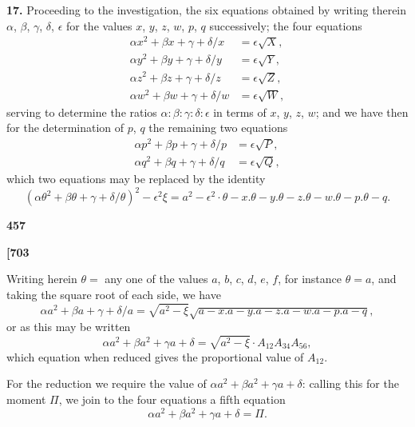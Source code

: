 \documentclass[12pt,a4paper]{article}
\theoremstyle{definition}
\begin{document}
\noindent\textbf{17.}\quad
Proceeding to the investigation, the six equations obtained by writing therein $\alpha$, $\beta$, $\gamma$, $\delta$, $\epsilon$ for the values $x$, $y$, $z$, $w$, $p$, $q$ successively; the four equations
\begin{align*}
\alpha x^2 + \beta x + \gamma + \delta/x &= \epsilon\sqrt{X}, \\
\alpha y^2 + \beta y + \gamma + \delta/y &= \epsilon\sqrt{Y}, \\
\alpha z^2 + \beta z + \gamma + \delta/z &= \epsilon\sqrt{Z}, \\
\alpha w^2 + \beta w + \gamma + \delta/w &= \epsilon\sqrt{W},
\end{align*}
serving to determine the ratios $\alpha : \beta : \gamma : \delta : \epsilon$ in terms of $x$, $y$, $z$, $w$; and we have then for the determination of $p$, $q$ the remaining two equations
\begin{align*}
\alpha p^2 + \beta p + \gamma + \delta/p &= \epsilon\sqrt{P}, \\
\alpha q^2 + \beta q + \gamma + \delta/q &= \epsilon\sqrt{Q},
\end{align*}
which two equations may be replaced by the identity
\[
(\alpha\theta^2 + \beta\theta + \gamma + \delta/\theta)^2 - \epsilon^2\xi = a^2 - \epsilon^2 \cdot \theta - x . \theta - y . \theta - z . \theta - w . \theta - p . \theta - q.
\]

\vspace{1em}

\begin{center}
\textbf{457}
\end{center}

\vspace{0.5em}

\noindent\textbf{[703}

\vspace{0.5em}

Writing herein $\theta = $ any one of the values $a$, $b$, $c$, $d$, $e$, $f$, for instance $\theta = a$, and taking the square root of each side, we have
\[
\alpha a^2 + \beta a + \gamma + \delta/a = \sqrt{a^2 - \xi}\sqrt{a - x . a - y . a - z . a - w . a - p . a - q},
\]
or as this may be written
\[
\alpha a^2 + \beta a^2 + \gamma a + \delta = \sqrt{a^2 - \xi} \cdot A_{12} A_{34} A_{56},
\]
which equation when reduced gives the proportional value of $A_{12}$.

For the reduction we require the value of $\alpha a^2 + \beta a^2 + \gamma a + \delta$: calling this for the moment $\Pi$, we join to the four equations a fifth equation
\[
\alpha a^2 + \beta a^2 + \gamma a + \delta = \Pi.
\]
\end{document}
